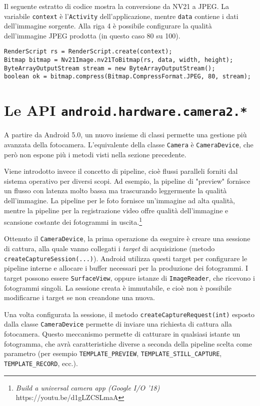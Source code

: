 Il seguente estratto di codice mostra la conversione da NV21 a JPEG. La variabile \texttt{context} è l'\texttt{Activity} dell'applicazione, mentre \texttt{data} contiene i dati dell'immagine sorgente. Alla riga 4 è possibile configurare la qualità dell'immagine JPEG prodotta (in questo caso 80 su 100).

\begin{verbatim}
RenderScript rs = RenderScript.create(context);
Bitmap bitmap = Nv21Image.nv21ToBitmap(rs, data, width, height);
ByteArrayOutputStream stream = new ByteArrayOutputStream();
boolean ok = bitmap.compress(Bitmap.CompressFormat.JPEG, 80, stream);
\end{verbatim}


\section{Le API \texttt{android.hardware.camera2.*}}
\label{sec:hdmi_camera2}

A partire da Android 5.0, un nuovo insieme di classi permette una gestione più avanzata della fotocamera. L'equivalente della classe \texttt{Camera} è \texttt{CameraDevice}, che però non espone più i metodi visti nella sezione precedente.

Viene introdotto invece il concetto di pipeline, cioè flussi paralleli forniti dal sistema operativo per diversi scopi. Ad esempio, la pipeline di "preview" fornisce un flusso con latenza molto bassa ma trascurando leggermente la qualità dell'immagine. La pipeline per le foto fornisce un'immagine ad alta qualità, mentre la pipeline per la registrazione video offre qualità dell'immagine e scansione costante dei fotogrammi in uscita.\footnote{\emph{Build a universal camera app (Google I/O '18)} https://youtu.be/d1gLZCSLmaA}

Ottenuto il \texttt{CameraDevice}, la prima operazione da eseguire è creare una sessione di cattura, alla quale vanno collegati i \emph{target} di acquisizione (metodo \texttt{createCaptureSession(...)}). Android utilizza questi target per configurare le pipeline interne e allocare i buffer necessari per la produzione dei fotogrammi.\cite{camera2} I target possono essere \texttt{SurfaceView}, oppure istanze di \texttt{ImageReader}, che ricevono i fotogrammi singoli. La sessione creata è immutabile, e cioè non è possibile modificarne i target se non creandone una nuova.

Una volta configurata la sessione, il metodo \texttt{createCaptureRequest(int)} esposto dalla classe \texttt{CameraDevice} permette di inviare una richiesta di cattura alla fotocamera. Questo meccanismo permette di catturare in qualsiasi istante un fotogramma, che avrà caratteristiche diverse a seconda della pipeline scelta come parametro (per esempio \texttt{TEMPLATE\_PREVIEW}, \texttt{TEMPLATE\_STILL\_CAPTURE}, \texttt{TEMPLATE\_RECORD}, ecc.).


